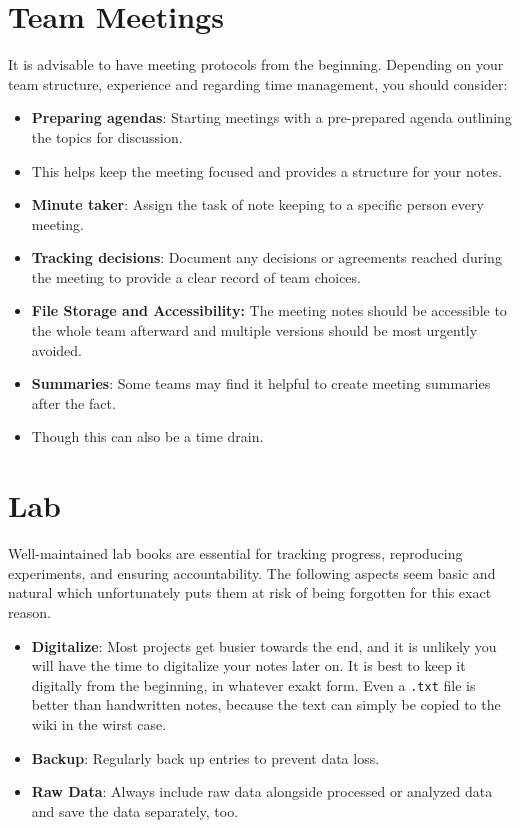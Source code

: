 \section{Team Meetings} \label{sec:team-meetings} 
It is advisable to have meeting protocols from the beginning.
Depending on your team structure, experience and regarding time management, you should consider:
\begin{itemize}
    \item \textbf{Preparing agendas}: Starting meetings with a pre-prepared agenda outlining the topics for discussion.
    \item This helps keep the meeting focused and provides a structure for your notes.
    \item \textbf{Minute taker}: Assign the task of note keeping to a specific person every meeting.
    \item \textbf{Tracking decisions}: Document any decisions or agreements reached during the meeting to provide a clear record of team choices.
    \item \textbf{File Storage and Accessibility:} The meeting notes should be accessible to the whole team afterward and multiple versions should be most urgently avoided.
    \item \textbf{Summaries}: Some teams may find it helpful to create meeting summaries after the fact.
    \item Though this can also be a time drain.
\end{itemize}
\section{Lab} \label{sec:lab} 
Well-maintained lab books are essential for tracking progress, reproducing experiments, and ensuring accountability.
The following aspects seem basic and natural which unfortunately puts them at risk of being forgotten for this exact reason.  
\begin{itemize}
    \item \textbf{Digitalize}: Most projects get busier towards the end, and it is unlikely you will have the time to digitalize your notes later on.
    It is best to keep it digitally from the beginning, in whatever exakt form.
    Even a \texttt{.txt} file is better than handwritten notes, because the text can simply be copied to the wiki in the wirst case.
    \item \textbf{Backup}: Regularly back up entries to prevent data loss.
    \item \textbf{Raw Data}: Always include raw data alongside processed or analyzed data and save the data separately, too.
\end{itemize}

